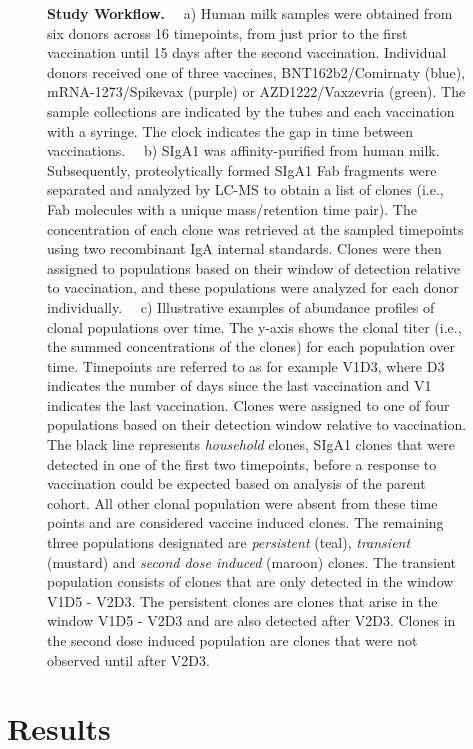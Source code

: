 \addtocounter{figure}{-1}

\begin{figure}[!ht]
  \caption{\textbf{Study Workflow.} ~~a) Human milk samples were obtained from six donors across 16 timepoints, from just prior to the first vaccination until 15 days after the second vaccination. Individual donors received one of three vaccines, BNT162b2/Comirnaty (blue), mRNA-1273/Spikevax (purple) or AZD1222/Vaxzevria (green). The sample collections are indicated by the tubes and each vaccination with a syringe. The clock indicates the gap in time between vaccinations. ~~b) SIgA1 was affinity-purified from human milk. Subsequently, proteolytically formed SIgA1 Fab fragments were separated and analyzed by LC-MS to obtain a list of clones (i.e., Fab molecules with a unique mass/retention time pair). The concentration of each clone was retrieved at the sampled timepoints using two recombinant IgA internal standards. Clones were then assigned to populations based on their window of detection relative to vaccination, and these populations were analyzed for each donor individually. ~~c) Illustrative examples of abundance profiles of clonal populations over time. The y-axis shows the clonal titer (i.e., the summed concentrations of the clones) for each population over time. Timepoints are referred to as for example V1D3, where D3 indicates the number of days since the last vaccination and V1 indicates the last vaccination. Clones were assigned to one of four populations based on their detection window relative to vaccination. The black line represents \emph{household} clones, SIgA1 clones that were detected in one of the first two timepoints, before a response to vaccination could be expected based on analysis of the parent cohort. All other clonal population were absent from these time points and are considered vaccine induced clones. The remaining three populations designated are \emph{persistent} (teal), \emph{transient} (mustard) and \emph{second dose induced} (maroon) clones. The transient population consists of clones that are only detected in the window V1D5 - V2D3. The persistent clones are clones that arise in the window V1D5 - V2D3 and are also detected after V2D3. Clones in the second dose induced population are clones that were not observed until after V2D3.}
\end{figure}


\section{Results}


